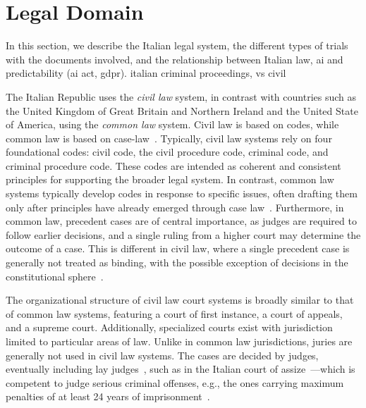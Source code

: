 \section{Legal Domain}
\label{sec:domains}
In this section, we describe the Italian legal system, the different types of trials with the documents involved, and the relationship between Italian law, \acl{ai} and predictability (ai act, gdpr).
italian criminal proceedings, vs civil

The Italian Republic uses the \emph{civil law} system, in contrast with countries such as the United Kingdom of Great Britain and Northern Ireland and the United State of America, using the \emph{common law} system. Civil law is based on codes, while common law is based on case-law~\cite{Carlson2009}. Typically, civil law systems rely on four foundational codes: civil code, the civil procedure code, criminal code, and criminal procedure code.  These codes are intended as coherent and consistent principles for supporting the broader legal system. In contrast, common law systems typically develop codes in response to specific issues, often drafting them only after principles have already emerged through case law~\cite{Carlson2009}.
Furthermore, in common law, precedent cases are of central importance, as judges are required to follow earlier decisions, and a single ruling from a higher court may determine the outcome of a case. This is different in civil law, where a single precedent case is generally not treated as binding, with the possible exception of decisions in the constitutional sphere~\cite{Carlson2009}. 

The organizational structure of civil law court systems is broadly similar to that of common law systems, featuring a court of first instance, a court of appeals, and a supreme court. Additionally, specialized courts exist with jurisdiction limited to particular areas of law. Unlike in common law jurisdictions, juries are generally not used in civil law systems. The cases are decided by judges, eventually including lay judges~\cite{Carlson2009}, such as in the Italian court of assize~\cite[Article~3]{legge10apr1951}---which is competent to judge serious criminal offenses, e.g., the ones carrying maximum penalties of at least 24 years of imprisonment~\cite[Art.~5]{CPP}.  

